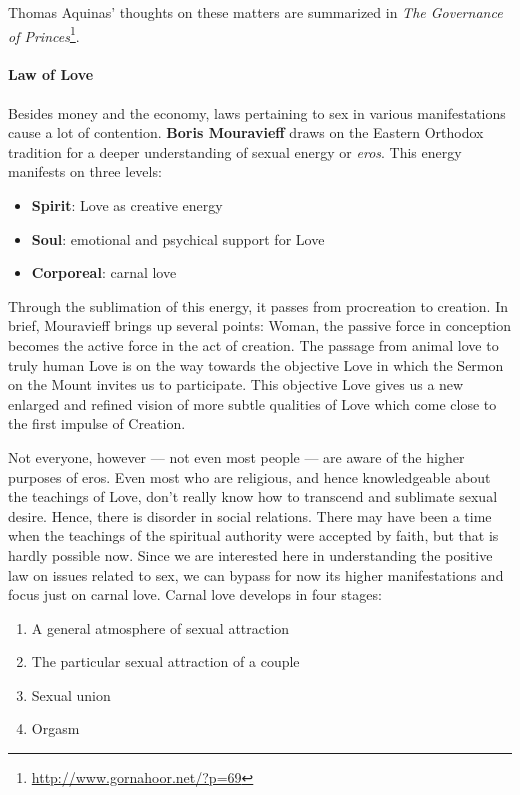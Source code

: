 Thomas Aquinas' thoughts on these matters are summarized in \textit{The Governance of Princes}\footnote{\url{http://www.gornahoor.net/?p=69}}.

\paragraph{Law of Love}


Besides money and the economy, laws pertaining to sex in various manifestations cause a lot of contention. \textbf{Boris Mouravieff} draws on the Eastern Orthodox tradition for a deeper understanding of sexual energy or \emph{eros}. This energy manifests on three levels:

\begin{itemize}


\item \textbf{Spirit}: Love as creative energy


\item \textbf{Soul}: emotional and psychical support for Love


\item \textbf{Corporeal}: carnal love

\end{itemize}


Through the sublimation of this energy, it passes from procreation to creation. In brief, Mouravieff brings up several points: Woman, the passive force in conception becomes the active force in the act of creation. The passage from animal love to truly human Love is on the way towards the objective Love in which the Sermon on the Mount invites us to participate. This objective Love gives us a new enlarged and refined vision of more subtle qualities of Love which come close to the first impulse of Creation.

Not everyone, however --- not even most people --- are aware of the higher purposes of eros. Even most who are religious, and hence knowledgeable about the teachings of Love, don't really know how to transcend and sublimate sexual desire. Hence, there is disorder in social relations. There may have been a time when the teachings of the spiritual authority were accepted by faith, but that is hardly possible now. Since we are interested here in understanding the positive law on issues related to sex, we can bypass for now its higher manifestations and focus just on carnal love. Carnal love develops in four stages:

\begin{enumerate}


\item A general atmosphere of sexual attraction

\item The particular sexual attraction of a couple

\item Sexual union

\item Orgasm
\end{enumerate}


